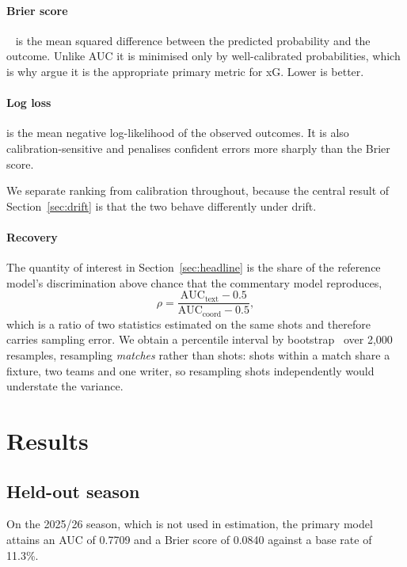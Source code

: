 \documentclass[conference]{IEEEtran}
\newcommand{\num}[1]{\mbox{#1}}
\begin{document}
\paragraph{Brier score}~\cite{brier1950verification} is the mean squared
difference between the predicted probability and the outcome. Unlike AUC it is
minimised only by well-calibrated probabilities, which is why
\cite{robberechts2020data} argue it is the appropriate primary metric for xG.
Lower is better.

\paragraph{Log loss} is the mean negative log-likelihood of the observed
outcomes. It is also calibration-sensitive and penalises confident errors more
sharply than the Brier score.

We separate ranking from calibration throughout, because the central result of
Section~\ref{sec:drift} is that the two behave differently under drift.

\paragraph{Recovery} The quantity of interest in
Section~\ref{sec:headline} is the share of the reference model's
discrimination above chance that the commentary model reproduces,
\begin{equation}
\rho = \frac{\mathrm{AUC}_{\text{text}} - 0.5}
            {\mathrm{AUC}_{\text{coord}} - 0.5},
\label{eq:recovery}
\end{equation}
which is a ratio of two statistics estimated on the same shots and therefore
carries sampling error. We obtain a percentile interval by
bootstrap~\cite{efron1979bootstrap} over \num{2,000} resamples, resampling
\emph{matches} rather than shots: shots within a match share a fixture, two
teams and one writer, so resampling shots independently would understate the
variance.

\section{Results}

\subsection{Held-out season}

On the 2025/26 season, which is not used in estimation, the primary model
attains an AUC of \num{0.7709} and a Brier score of \num{0.0840} against a
base rate of 11.3\%.
\end{document}
